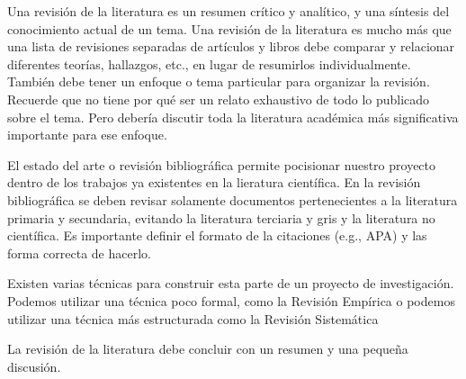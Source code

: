 Una revisión de la literatura es un resumen crítico y analítico, y una síntesis del conocimiento actual de un tema. Una revisión de la literatura es mucho más que una lista de revisiones separadas de artículos y libros debe comparar y relacionar diferentes teorías, hallazgos, etc., en lugar de resumirlos individualmente.
También debe tener un enfoque o tema particular para organizar la revisión.  Recuerde que no tiene por qué ser un relato exhaustivo de todo lo publicado sobre el tema. Pero debería discutir toda la literatura académica más significativa importante para ese enfoque.

El estado del arte o revisión bibliográfica permite pocisionar nuestro proyecto dentro de los trabajos ya existentes en la lieratura científica. En la revisión bibliográfica se deben revisar solamente documentos pertenecientes a la literatura primaria y secundaria, evitando la literatura terciaria y gris y la literatura no científica. Es importante definir el formato de la citaciones (e.g., APA) y las forma correcta de hacerlo.

 Existen varias técnicas para construir esta parte de un proyecto de investigación. Podemos utilizar una técnica poco formal, como la Revisión Empírica o podemos utilizar una técnica más estructurada como la Revisión Sistemática~\cite{moreno2018revisiones}

La revisión de la literatura debe concluir con un resumen y una pequeña discusión.
